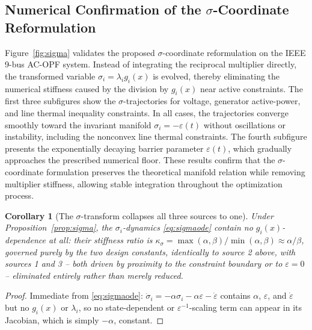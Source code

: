 \documentclass[11pt,onecolumn]{article}
\newtheorem{corollary}[theorem]{Corollary}
\theoremstyle{definition}
\theoremstyle{remark}
\begin{document}
\subsection{Numerical Confirmation of the $\sigma$-Coordinate Reformulation}

Figure~\ref{fig:sigma} validates the proposed $\sigma$-coordinate
reformulation on the IEEE 9-bus AC-OPF system. Instead of integrating the reciprocal multiplier directly, the transformed variable
$\sigma_i=\lambda_i g_i(x)$ is evolved, thereby eliminating the numerical stiffness caused by the division by $g_i(x)$ near active constraints. The first three subfigures show the $\sigma$-trajectories for voltage, generator active-power, and line thermal inequality constraints. In all cases, the trajectories converge smoothly toward the invariant manifold $\sigma_i=-\varepsilon(t)$ without oscillations or instability, including the nonconvex line thermal constraints. The fourth subfigure presents the exponentially decaying barrier parameter $\varepsilon(t)$, which gradually approaches the prescribed numerical floor. These results confirm that the $\sigma$-coordinate formulation preserves the theoretical manifold relation while removing multiplier stiffness, allowing stable integration throughout the optimization process.








\begin{corollary}[The $\sigma$-transform collapses all three sources to one]
Under Proposition~\ref{prop:sigma}, the $\sigma_i$-dynamics \eqref{eq:sigmaode} contain no
$g_i(x)$-dependence at all: their stiffness ratio is
$\kappa_\sigma = \max(\alpha,\beta)/\min(\alpha,\beta) \approx \alpha/\beta$, governed purely by
the two design constants, identically to source 2 above, with sources 1 and 3 -- both driven by
proximity to the constraint boundary or to $\varepsilon = 0$ -- eliminated entirely rather than
merely reduced.
\end{corollary}

\begin{proof}
Immediate from \eqref{eq:sigmaode}: $\dot\sigma_i = -\alpha\sigma_i - \alpha\varepsilon
- \dot\varepsilon$ contains $\alpha$, $\varepsilon$, and $\dot\varepsilon$ but no $g_i(x)$ or
$\lambda_i$, so no state-dependent or $\varepsilon^{-1}$-scaling term can appear in its
Jacobian, which is simply $-\alpha$, constant.
\end{proof}
\end{document}

